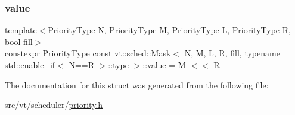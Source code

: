 \subsubsection{\texorpdfstring{value}{value}}
{\footnotesize\ttfamily template$<$Priority\+Type N, Priority\+Type M, Priority\+Type L, Priority\+Type R, bool fill$>$ \\
constexpr \hyperlink{namespacevt_a86bff9f556eb761b27fc8600d006ac04}{Priority\+Type} const \hyperlink{structvt_1_1sched_1_1_mask}{vt\+::sched\+::\+Mask}$<$ N, M, L, R, fill, typename std\+::enable\+\_\+if$<$ N==R $>$\+::type $>$\+::value = M $<$$<$ R\hspace{0.3cm}{\ttfamily [static]}}



The documentation for this struct was generated from the following file\+:\begin{DoxyCompactItemize}
\item 
src/vt/scheduler/\hyperlink{priority_8h}{priority.\+h}\end{DoxyCompactItemize}
